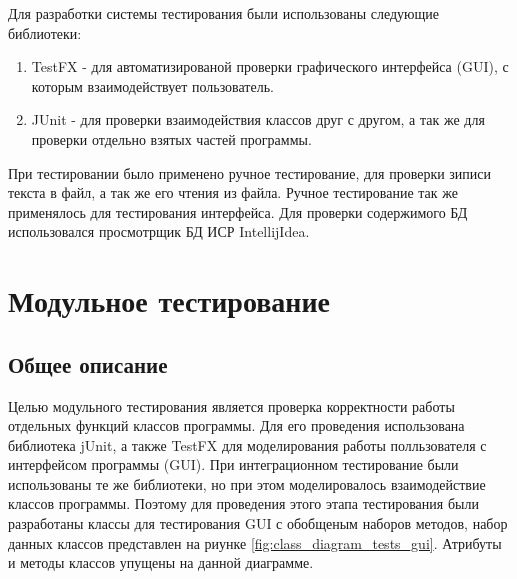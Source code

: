 \documentclass[a4paper,12pt]{article}
\begin{document}
Для разработки системы тестирования были использованы следующие библиотеки:
\begin{enumerate}
\item TestFX - для автоматизированой проверки графического интерфейса (GUI), с которым взаимодействует пользователь.
\item JUnit - для проверки взаимодействия классов друг с другом, а так же для проверки отдельно взятых частей программы.
\end{enumerate}
\par При тестировании было применено ручное тестирование, для проверки зиписи текста в файл, а так же его чтения из файла. Ручное тестирование так же применялось для тестирования интерфейса. Для проверки содержимого БД использовался просмотрщик БД ИСР IntellijIdea.

\newpage \section{Модульное тестирование}
\subsection{Общее описание}
Целью модульного тестирования является проверка корректности работы отдельных функций классов программы.
Для его проведения использована библиотека jUnit, а также TestFX для моделирования работы полльзователя с интерфейсом программы (GUI). При интеграционном тестирование были использованы те же библиотеки, но при этом моделировалось взаимодействие классов программы. Поэтому для проведения этого этапа тестирования были разработаны классы для тестирования GUI с обобщеным наборов методов, набор данных классов представлен на риунке \ref{fig:class_diagram_tests_gui}. Атрибуты и методы классов упущены на данной диаграмме.
\end{document}

